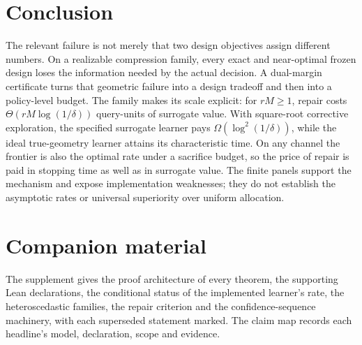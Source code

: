 \section{Conclusion}

The relevant failure is not merely that two design objectives assign different numbers.
On a realizable compression family, every exact and near-optimal frozen design loses the
information needed by the actual decision. A dual-margin certificate turns that geometric
failure into a design tradeoff and then into a policy-level budget. The family makes its
scale explicit: for $rM\ge1$, repair costs $\Theta(rM\log(1/\delta))$ query-units of surrogate
value. With square-root corrective exploration, the specified surrogate learner pays
$\Omega(\log^2(1/\delta))$, while the ideal true-geometry learner attains its characteristic
time. On any channel the frontier is also the optimal rate under a sacrifice budget, so the
price of repair is paid in stopping time as well as in surrogate value. The finite panels
support the mechanism and expose implementation weaknesses; they
do not establish the asymptotic rates or universal superiority over uniform allocation.

\section*{Companion material}
The supplement gives the proof architecture of every theorem, the supporting Lean declarations,
the conditional status of the implemented learner's rate, the heteroscedastic families, the
repair criterion and the confidence-sequence machinery, with each superseded statement marked.
The claim map records each headline's model, declaration, scope and evidence.

